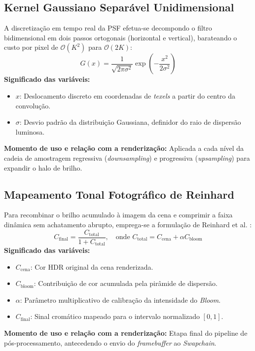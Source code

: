 \documentclass[12pt,a4paper]{article}
\begin{document}
\subsection{Kernel Gaussiano Separável Unidimensional}
A discretização em tempo real da PSF efetua-se decompondo o filtro bidimensional em dois passos ortogonais (horizontal e vertical), barateando o custo por pixel de $\mathcal{O}(K^2)$ para $\mathcal{O}(2K)$:
\begin{equation}
    G(x) = \frac{1}{\sqrt{2\pi\sigma^2}} \exp\left(-\frac{x^2}{2\sigma^2}\right)
    \label{eq:gauss}
\end{equation}
\textbf{Significado das variáveis:}
\begin{itemize}
    \item $x$: Deslocamento discreto em coordenadas de \textit{texels} a partir do centro da convolução.
    \item $\sigma$: Desvio padrão da distribuição Gaussiana, definidor do raio de dispersão luminosa.
\end{itemize}
\textbf{Momento de uso e relação com a renderização:} Aplicada a cada nível da cadeia de amostragem regressiva (\textit{downsampling}) e progressiva (\textit{upsampling}) para expandir o halo de brilho.

\subsection{Mapeamento Tonal Fotográfico de Reinhard}
Para recombinar o brilho acumulado à imagem da cena e comprimir a faixa dinâmica sem achatamento abrupto, emprega-se a formulação de Reinhard et al. \cite{reinhard2002tone}:
\begin{equation}
    C_{\text{final}} = \frac{C_{\text{total}}}{1 + C_{\text{total}}}, \quad \text{onde } C_{\text{total}} = C_{\text{cena}} + \alpha C_{\text{bloom}}
    \label{eq:reinhard}
\end{equation}
\textbf{Significado das variáveis:}
\begin{itemize}
    \item $C_{\text{cena}}$: Cor HDR original da cena renderizada.
    \item $C_{\text{bloom}}$: Contribuição de cor acumulada pela pirâmide de dispersão.
    \item $\alpha$: Parâmetro multiplicativo de calibração da intensidade do \textit{Bloom}.
    \item $C_{\text{final}}$: Sinal cromático mapeado para o intervalo normalizado $[0, 1]$.
\end{itemize}
\textbf{Momento de uso e relação com a renderização:} Etapa final do pipeline de pós-processamento, antecedendo o envio do \textit{framebuffer} ao \textit{Swapchain}.
\end{document}
